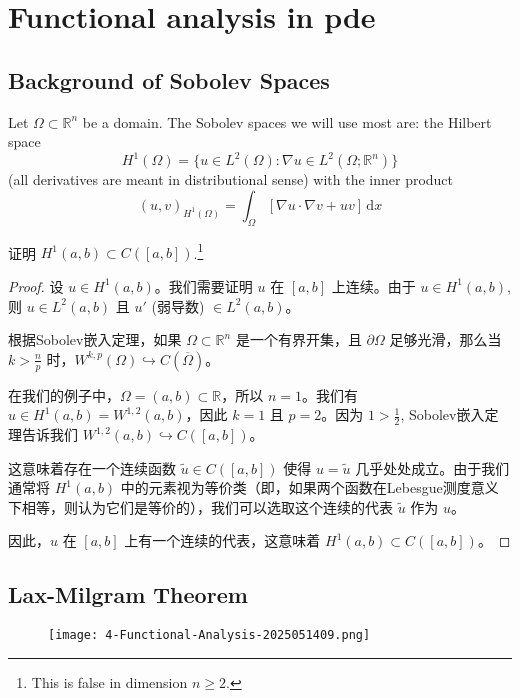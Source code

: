 \section{Functional analysis in pde}

\subsection{Background of Sobolev Spaces}

Let $\Omega \subset \mathbb{R}^{n}$ be a domain. The Sobolev spaces we will use most are: the Hilbert space
\[
H^{1}(\Omega)=\{ u\in L^{2}(\Omega):\nabla u\in L^2(\Omega;\mathbb{R}^{n}) \}
\]
(all derivatives are meant in distributional sense) with the inner product
\[
(u,v)_{H^{1}(\Omega)}=\int_{\Omega}^{} [\nabla u\cdot \nabla v+uv] \, \mathrm{d}x
\]
\begin{theorem}
证明 $H^1(a, b) \subset C([a, b])$.\footnote{This is false in dimension $n\geq2$.}
\end{theorem}
\begin{proof}
设 $u \in H^1(a, b)$。我们需要证明 $u$ 在 $[a, b]$ 上连续。由于 $u \in H^1(a, b)$, 则 $u \in L^2(a, b)$ 且 $u'$ (弱导数) $\in L^2(a, b)$。

根据Sobolev嵌入定理，如果 $\Omega \subset \mathbb{R}^n$ 是一个有界开集，且 $\partial \Omega$ 足够光滑，那么当 $k > \frac{n}{p}$ 时，$W^{k, p}(\Omega) \hookrightarrow C(\overline{\Omega})$。

在我们的例子中，$\Omega = (a, b) \subset \mathbb{R}$，所以 $n = 1$。我们有 $u \in H^1(a, b) = W^{1, 2}(a, b)$，因此 $k = 1$ 且 $p = 2$。因为 $1 > \frac{1}{2}$, Sobolev嵌入定理告诉我们 $W^{1, 2}(a, b) \hookrightarrow C([a, b])$。

这意味着存在一个连续函数 $\tilde{u} \in C([a, b])$ 使得 $u = \tilde{u}$ 几乎处处成立。由于我们通常将 $H^1(a, b)$ 中的元素视为等价类（即，如果两个函数在Lebesgue测度意义下相等，则认为它们是等价的），我们可以选取这个连续的代表 $\tilde{u}$ 作为 $u$。

因此，$u$ 在 $[a, b]$ 上有一个连续的代表，这意味着 $H^1(a, b) \subset C([a, b])$。

\end{proof}

\subsection{Lax-Milgram Theorem}

\begin{figure}[H]
\centering
\texttt{[image: 4-Functional-Analysis-2025051409.png]}
\label{}
\end{figure}

